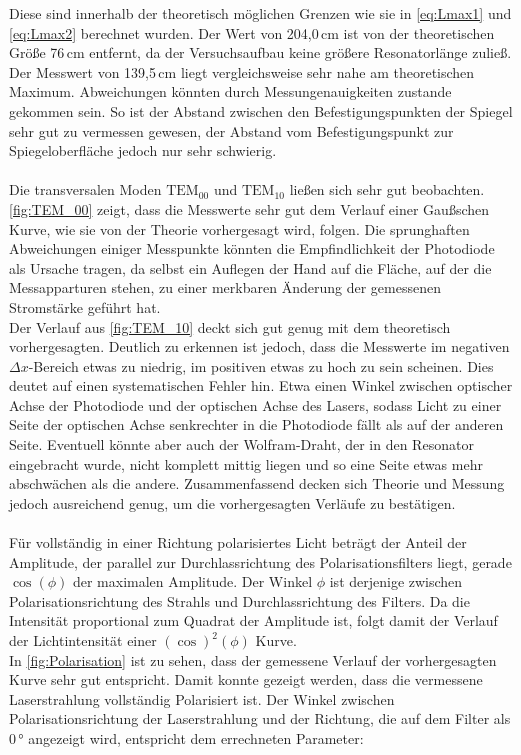 Diese sind innerhalb der theoretisch möglichen Grenzen wie sie in \autoref{eq:Lmax1} und \autoref{eq:Lmax2} berechnet wurden. 
Der Wert von 204,0\,cm ist von der theoretischen Größe 76\,cm entfernt, da der Versuchsaufbau keine größere Resonatorlänge zuließ.
Der Messwert von 139,5\,cm liegt vergleichsweise sehr nahe am theoretischen Maximum. Abweichungen könnten durch Messungenauigkeiten zustande gekommen sein. So ist der Abstand zwischen den Befestigungspunkten der Spiegel sehr gut zu vermessen gewesen, der Abstand vom Befestigungspunkt zur Spiegeloberfläche jedoch nur sehr schwierig.\\
\\
Die transversalen Moden $\text{TEM}_{00}$ und $\text{TEM}_{10}$ ließen sich sehr gut beobachten.
\autoref{fig:TEM_00} zeigt, dass die Messwerte sehr gut dem Verlauf einer Gaußschen Kurve, wie sie von der Theorie vorhergesagt wird, folgen. Die sprunghaften Abweichungen einiger Messpunkte könnten die Empfindlichkeit der Photodiode als Ursache tragen, da selbst ein Auflegen der Hand auf die Fläche, auf der die Messapparturen stehen, zu einer merkbaren Änderung der gemessenen Stromstärke geführt hat.\\
Der Verlauf aus \autoref{fig:TEM_10} deckt sich gut genug mit dem theoretisch vorhergesagten. Deutlich zu erkennen ist jedoch, dass die Messwerte im negativen $\Delta x$-Bereich etwas zu niedrig, im positiven etwas zu hoch zu sein scheinen. Dies deutet auf einen systematischen Fehler hin. Etwa einen Winkel zwischen optischer Achse der Photodiode und der optischen Achse des Lasers, sodass Licht zu einer Seite der optischen Achse senkrechter in die Photodiode fällt als auf der anderen Seite. Eventuell könnte aber auch der Wolfram-Draht, der in den Resonator eingebracht wurde, nicht komplett mittig liegen und so eine Seite etwas mehr abschwächen als die andere. Zusammenfassend decken sich Theorie und Messung jedoch ausreichend genug, um die vorhergesagten Verläufe zu bestätigen.\\
\\
Für vollständig in einer Richtung polarisiertes Licht beträgt der Anteil der Amplitude, der parallel zur Durchlassrichtung des Polarisationsfilters liegt, gerade $\cos (\phi)$ der maximalen Amplitude. Der Winkel $\phi$ ist derjenige zwischen Polarisationsrichtung des Strahls und Durchlassrichtung des Filters. Da die Intensität proportional zum Quadrat der Amplitude ist, folgt damit der Verlauf der Lichtintensität einer $(\cos)^{2}(\phi)$ Kurve.\\
In \autoref{fig:Polarisation} ist zu sehen, dass der gemessene Verlauf der vorhergesagten Kurve sehr gut entspricht.
Damit konnte gezeigt werden, dass die vermessene Laserstrahlung vollständig Polarisiert ist.
 Der Winkel zwischen Polarisationsrichtung der Laserstrahlung und der Richtung, die auf dem Filter als 0\,° angezeigt wird, entspricht dem errechneten Parameter:

